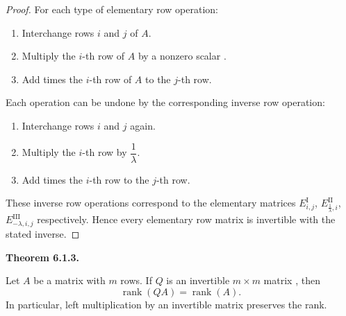 \documentclass[12pt]{article}
\begin{document}
\begin{proof}
For each type of elementary row operation:

\begin{enumerate}
    \item[(I)] Interchange rows $i$ and $j$ of $A$.
    \item[(II)] Multiply the $i$-th row of $A$ by a nonzero scalar .
    \item[(III)] Add  times the $i$-th row of $A$ to the $j$-th row.
\end{enumerate}

Each operation can be undone by the corresponding inverse row operation:

\begin{enumerate}
    \item[(I)] Interchange rows $i$ and $j$ again.
    \item[(II)] Multiply the $i$-th row by $\dfrac{1}{\lambda}$.
    \item[(III)] Add  times the $i$-th row to the $j$-th row.
\end{enumerate}

These inverse row operations correspond to the elementary matrices $E^{\mathrm{I}}_{i,j}$,
$E^{\mathrm{II}}_{\frac{1}{\lambda},i}$, $E^{\mathrm{III}}_{-\lambda,i,j}$
respectively. Hence every elementary row matrix is invertible with the stated inverse.
\end{proof}

\textbf{Theorem 6.1.3.}

Let $A$ be a matrix with $m$ rows. If $Q$ is an invertible
$m \times m$ matrix \textcolor{red}{}, then
\[
\operatorname{rank}(QA)=\operatorname{rank}(A).
\]
In particular, left multiplication by an invertible matrix preserves the rank.
\end{document}
